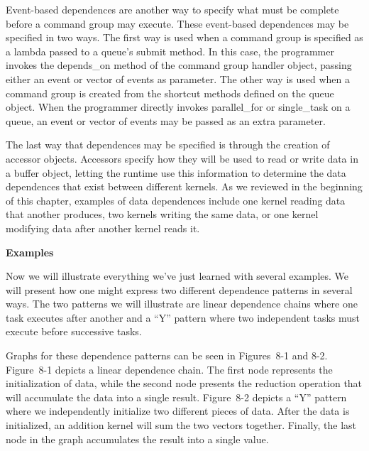 Event-based dependences are another way to specify what must be complete before a command group may execute. These event-based dependences may be specified in two ways. The first way is used when a command group is specified as a lambda passed to a queue’s submit method. In this case, the programmer invokes the depends\_on method of the command group handler object, passing either an event or vector of events as parameter. The other way is used when a command group is created from the shortcut methods defined on the queue object. When the programmer directly invokes parallel\_for or single\_task on a queue, an event or vector of events may be passed as an extra parameter.\par

The last way that dependences may be specified is through the creation of accessor objects. Accessors specify how they will be used to read or write data in a buffer object, letting the runtime use this information to determine the data dependences that exist between different kernels. As we reviewed in the beginning of this chapter, examples of data dependences include one kernel reading data that another produces, two kernels writing the same data, or one kernel modifying data after another kernel reads it.\par

\hspace*{\fill} \par %
\textbf{Examples}

Now we will illustrate everything we’ve just learned with several examples. We will present how one might express two different dependence patterns in several ways. The two patterns we will illustrate are linear dependence chains where one task executes after another and a “Y” pattern where two independent tasks must execute before successive tasks.\par

Graphs for these dependence patterns can be seen in Figures 8-1 and 8-2. Figure 8-1 depicts a linear dependence chain. The first node represents the initialization of data, while the second node presents the reduction operation that will accumulate the data into a single result. Figure 8-2 depicts a “Y” pattern where we independently initialize two different pieces of data. After the data is initialized, an addition kernel will sum the two vectors together. Finally, the last node in the graph accumulates the result into a single value.\par

